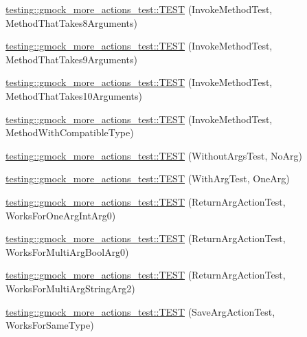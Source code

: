 \begin{DoxyCompactItemize}
\item 
\hyperlink{namespacetesting_1_1gmock__more__actions__test_a5bfedd2255bbfe7ffcbc76ec581b2ff6}{testing\+::gmock\+\_\+more\+\_\+actions\+\_\+test\+::\+T\+E\+ST} (Invoke\+Method\+Test, Method\+That\+Takes8\+Arguments)
\item 
\hyperlink{namespacetesting_1_1gmock__more__actions__test_acdcc7f6a35e6373f3d0b3a71f98c418b}{testing\+::gmock\+\_\+more\+\_\+actions\+\_\+test\+::\+T\+E\+ST} (Invoke\+Method\+Test, Method\+That\+Takes9\+Arguments)
\item 
\hyperlink{namespacetesting_1_1gmock__more__actions__test_a14b55eb4c0d0b3149e269eea1443cb58}{testing\+::gmock\+\_\+more\+\_\+actions\+\_\+test\+::\+T\+E\+ST} (Invoke\+Method\+Test, Method\+That\+Takes10\+Arguments)
\item 
\hyperlink{namespacetesting_1_1gmock__more__actions__test_adb0c29d688c079ad5bf07d5a0bd72aea}{testing\+::gmock\+\_\+more\+\_\+actions\+\_\+test\+::\+T\+E\+ST} (Invoke\+Method\+Test, Method\+With\+Compatible\+Type)
\item 
\hyperlink{namespacetesting_1_1gmock__more__actions__test_a68748f21021e787dfdc095691c94d495}{testing\+::gmock\+\_\+more\+\_\+actions\+\_\+test\+::\+T\+E\+ST} (Without\+Args\+Test, No\+Arg)
\item 
\hyperlink{namespacetesting_1_1gmock__more__actions__test_a40664c1acdc3650e8edf9a9a49b008de}{testing\+::gmock\+\_\+more\+\_\+actions\+\_\+test\+::\+T\+E\+ST} (With\+Arg\+Test, One\+Arg)
\item 
\hyperlink{namespacetesting_1_1gmock__more__actions__test_a717ea38d7b78b6d51b4d617ed317d26e}{testing\+::gmock\+\_\+more\+\_\+actions\+\_\+test\+::\+T\+E\+ST} (Return\+Arg\+Action\+Test, Works\+For\+One\+Arg\+Int\+Arg0)
\item 
\hyperlink{namespacetesting_1_1gmock__more__actions__test_a0705d7e6083d129caae9d91cc5d6d570}{testing\+::gmock\+\_\+more\+\_\+actions\+\_\+test\+::\+T\+E\+ST} (Return\+Arg\+Action\+Test, Works\+For\+Multi\+Arg\+Bool\+Arg0)
\item 
\hyperlink{namespacetesting_1_1gmock__more__actions__test_ae280b3b95b0cdfcf7b81de95c8fe942d}{testing\+::gmock\+\_\+more\+\_\+actions\+\_\+test\+::\+T\+E\+ST} (Return\+Arg\+Action\+Test, Works\+For\+Multi\+Arg\+String\+Arg2)
\item 
\hyperlink{namespacetesting_1_1gmock__more__actions__test_a511b9c6721629465fd1e2fbd65633ef9}{testing\+::gmock\+\_\+more\+\_\+actions\+\_\+test\+::\+T\+E\+ST} (Save\+Arg\+Action\+Test, Works\+For\+Same\+Type)
\item 

\end{DoxyCompactItemize}
